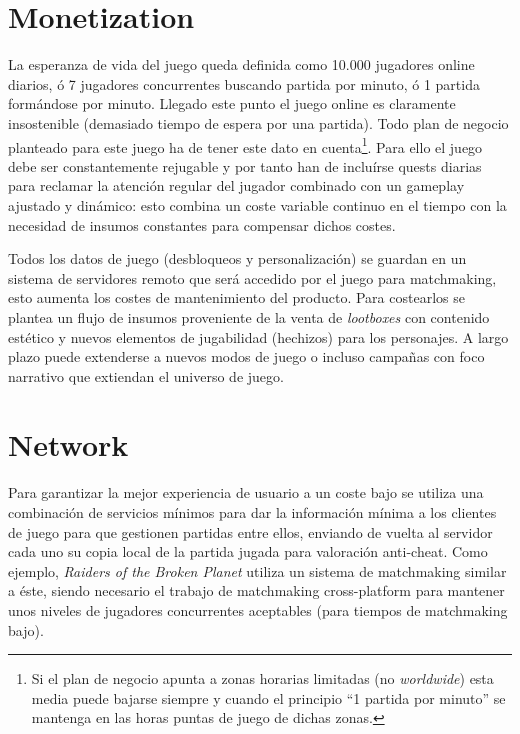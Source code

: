 \documentclass[12pt]{report}
\begin{document}
\chapter{Monetization}

La esperanza de vida del juego queda definida como 10.000 jugadores online diarios, ó 7 jugadores concurrentes buscando partida por minuto, ó 1 partida formándose por minuto. Llegado este punto el juego online es claramente insostenible (demasiado tiempo de espera por una partida). Todo plan de negocio planteado para este juego ha de tener este dato en cuenta\footnote{Si el plan de negocio apunta a zonas horarias limitadas (no \textit{worldwide}) esta media puede bajarse siempre y cuando el principio ``1 partida por minuto'' se mantenga en las horas puntas de juego de dichas zonas.}. Para ello el juego debe ser constantemente rejugable y por tanto han de incluírse quests diarias para reclamar la atención regular del jugador combinado con un gameplay ajustado y dinámico: esto combina un coste variable continuo en el tiempo con la necesidad de insumos constantes para compensar dichos costes.

Todos los datos de juego (desbloqueos y personalización) se guardan en un sistema de servidores remoto que será accedido por el juego para matchmaking, esto aumenta los costes de mantenimiento del producto. Para costearlos se plantea un flujo de insumos proveniente de la venta de \textit{lootboxes} con contenido estético y nuevos elementos de jugabilidad (hechizos) para los personajes. A largo plazo puede extenderse a nuevos modos de juego o incluso campañas con foco narrativo que extiendan el universo de juego.

\chapter{Network}

Para garantizar la mejor experiencia de usuario a un coste bajo se utiliza una combinación de servicios mínimos para dar la información mínima a los clientes de juego para que gestionen partidas entre ellos, enviando de vuelta al servidor cada uno su copia local de la partida jugada para valoración anti-cheat. Como ejemplo, \textit{Raiders of the Broken Planet} utiliza un sistema de matchmaking similar a éste, siendo necesario el trabajo de matchmaking cross-platform para mantener unos niveles de jugadores concurrentes aceptables (para tiempos de matchmaking bajo).
\end{document}
